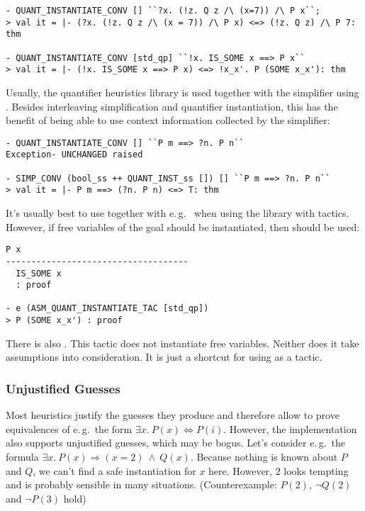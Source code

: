 \begin{session}
\begin{verbatim}
- QUANT_INSTANTIATE_CONV [] ``?x. (!z. Q z /\ (x=7)) /\ P x``;
> val it = |- (?x. (!z. Q z /\ (x = 7)) /\ P x) <=> (!z. Q z) /\ P 7: thm

- QUANT_INSTANTIATE_CONV [std_qp] ``!x. IS_SOME x ==> P x``
> val it = |- (!x. IS_SOME x ==> P x) <=> !x_x'. P (SOME x_x'): thm
\end{verbatim}
\end{session}

Usually, the quantifier heuristics library is used together with the
simplifier using . Besides interleaving
simplification and quantifier instantiation, this has the benefit of 
being able to use context information collected by the simplifier:

\begin{session}
\begin{verbatim}
- QUANT_INSTANTIATE_CONV [] ``P m ==> ?n. P n``
Exception- UNCHANGED raised

- SIMP_CONV (bool_ss ++ QUANT_INST_ss []) [] ``P m ==> ?n. P n``
> val it = |- P m ==> (?n. P n) <=> T: thm
\end{verbatim}
\end{session}

It's usually best to use 
together with e.\,g.\  when using the library with tactics.
However, if free variables of the goal should be instantiated, then
 should be used:

\begin{session}
\begin{verbatim}
P x
------------------------------------
  IS_SOME x
  : proof

- e (ASM_QUANT_INSTANTIATE_TAC [std_qp])
> P (SOME x_x') : proof
\end{verbatim}
\end{session}

There is also . This tactic does not
instantiate free variables. Neither does it take assumptions into consideration.
It is just a shortcut for using  as a tactic.


\subsubsection{Unjustified Guesses}

Most heuristics justify the guesses they produce and therefore allow to
prove equivalences of e.\,g.\ the form $\exists x.\ P(x) \Leftrightarrow P(i)$.
However, the implementation also supports unjustified guesses, which may be bogus.
Let's consider e.\,g.\ the formula $\exists x.\ P(x) \Longrightarrow (x = 2)\ \wedge\ Q(x)$.
Because nothing is known about $P$ and $Q$, we can't find a safe instantiation for $x$ here.
However, $2$ looks tempting and is probably sensible in many situations. (Counterexample:
$P(2)$, $\neg Q(2)$ and $\neg P(3)$ hold)

